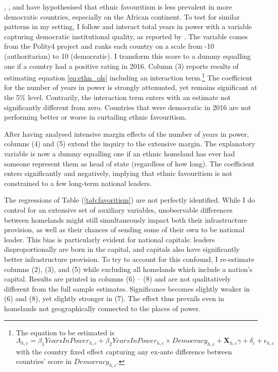 \documentclass[11pt, oneside]{article}   	%
\let\oldref\ref
\renewcommand{\ref}[1]{(\oldref{#1})}
\begin{document}
\cite{DeLuca_Ethnicfavoritismaxiom_2018}, \cite{Hodler_RegionalFavoritism_2014}, and \cite{Burgess_ValueDemocracyEvidence_2015} have hypothesised that ethnic favouritism is less prevalent in more democratic countries, especially on the African continent. To test for similar patterns in my setting, I follow \citeauthor{DeLuca_Ethnicfavoritismaxiom_2018} and interact total years in power with a variable capturing democratic institutional quality, as reported by \cite{Marshall_PolityProjectCenter_2015}. The variable comes from the Polity4 project and ranks each country on a scale from -10 (authoritarian) to 10 (democratic). I transform this score to a dummy equalling one if a country had a positive rating in 2016. Column (3) reports results of estimating equation \eqref{eq:ethn_ols} including an interaction term.\footnote{The equation to be estimated is \begin{equation*}
  \Lambda_{h,c} = \beta_{1} YearsInPower_{h,c} + \beta_{2} YearsInPower_{h,c}\times Democracy_{h,c} + \textbf{X}_{h,c}\gamma + \delta_{c} + \epsilon_{h,c}
\end{equation*} with the country fixed effect capturing any ex-ante difference between countries' score in $Democracy_{h,c}$.} The coefficient for the number of years in power is strongly attenuated, yet remains significant at the 5\% level. Contrarily, the interaction term enters with an estimate not significantly different from zero. Countries that were democratic in 2016 are not performing better or worse in curtailing ethnic favouritism.

After having analysed intensive margin effects of the number of years in power, columns (4) and (5) extend the inquiry to the extensive margin. The explanatory variable is now a dummy equalling one if an ethnic homeland has ever had someone represent them as head of state (regardless of how long). The coefficient enters significantly and negatively, implying that ethnic favouritism is not constrained to a few long-term national leaders.

The regressions of Table \ref{tab:favoritism} are not perfectly identified. While I do control for an extensive set of auxiliary variables, unobservable differences between homelands might still simultaneously impact both their infrastructure provision, as well as their chances of sending some of their own to be national leader. This bias is particularly evident for national capitals: leaders disproportionally are born in the capital, and capitals also have significantly better infrastructure provision. To try to account for this confound, I re-estimate columns (2), (3), and (5) while excluding all homelands which include a nation's capital. Results are printed in columns (6) -- (8) and are not qualitatively different from the full sample estimates. Significance becomes slightly weaker in (6) and (8), yet slightly stronger in (7). The effect thus prevails even in homelands not geographically connected to the places of power.
\end{document}
